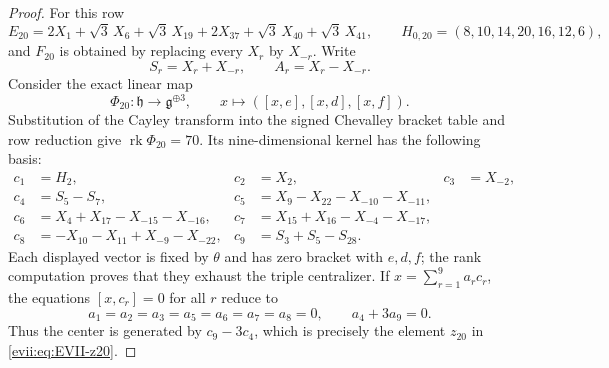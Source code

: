 \documentclass[11pt,reqno]{amsart}
\numberwithin{equation}{section}
\theoremstyle{definition}
\theoremstyle{remark}
\newcommand{\rk}{\operatorname{rk}}
\newcommand{\fg}{\mathfrak g}
\newcommand{\fh}{\mathfrak h}
\begin{document}
\begin{proof}
For this row
\[
 E_{20}=2X_1+\sqrt3\,X_6+\sqrt3\,X_{19}+2X_{37}
          +\sqrt3\,X_{40}+\sqrt3\,X_{41},
 \qquad
 H_{0,20}=(8,10,14,20,16,12,6),
\]
and $F_{20}$ is obtained by replacing every $X_r$ by $X_{-r}$.
Write
\[
 S_r=X_r+X_{-r},\qquad A_r=X_r-X_{-r}.
\]
Consider the exact linear map
\[
 \Phi_{20}:\fh\longrightarrow\fg^{\oplus3},\qquad
 x\longmapsto([x,e],[x,d],[x,f]).
\]
Substitution of the Cayley transform into the signed Chevalley bracket table
and row reduction give $\rk\Phi_{20}=70$.  Its nine-dimensional kernel has the
following basis:
\begin{align*}
 c_1&=H_2,& c_2&=X_2,&c_3&=X_{-2},\\
 c_4&=S_5-S_7,
 &c_5&=X_9-X_{22}-X_{-10}-X_{-11},\\
 c_6&=X_4+X_{17}-X_{-15}-X_{-16},
 &c_7&=X_{15}+X_{16}-X_{-4}-X_{-17},\\
 c_8&=-X_{10}-X_{11}+X_{-9}-X_{-22},
 &c_9&=S_3+S_5-S_{28}.
\end{align*}
Each displayed vector is fixed by $\theta$ and has zero bracket with $e,d,f$;
the rank computation proves that they exhaust the triple centralizer.
If $x=\sum_{r=1}^9a_rc_r$, the equations $[x,c_r]=0$ for all $r$ reduce to
\[
 a_1=a_2=a_3=a_5=a_6=a_7=a_8=0,
 \qquad a_4+3a_9=0.
\]
Thus the center is generated by $c_9-3c_4$, which is precisely the element
$z_{20}$ in \eqref{evii:eq:EVII-z20}.


\end{proof}
\end{document}
